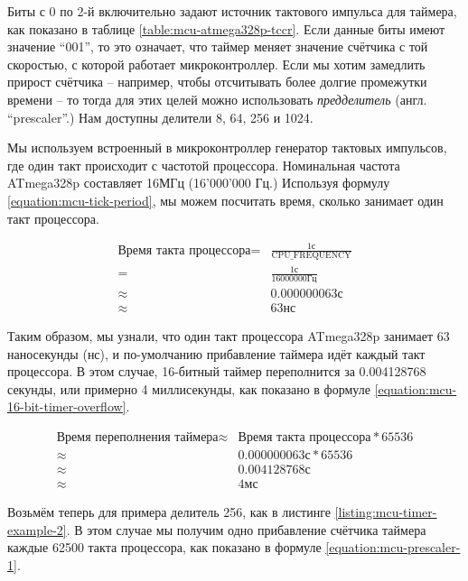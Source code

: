 \documentclass[../sparc.tex]{subfiles}
\begin{document}

Биты с 0 по 2-й включительно задают источник тактового импульса для таймера, как
показано в таблице \ref{table:mcu-atmega328p-tccr}.  Если данные биты имеют
значение ``001'', то это означает, что таймер меняет значение счётчика с той
скоростью, с которой работает микроконтроллер.  Если мы хотим замедлить прирост
счётчика -- например, чтобы отсчитывать более долгие промежутки времени -- то
тогда для этих целей можно использовать \emph{предделитель}
(англ. ``prescaler''.)  Нам доступны делители 8, 64, 256 и 1024.

Мы используем встроенный в микроконтроллер генератор тактовых импульсов, где
один такт происходит с частотой процессора.  Номинальная частота ATmega328p
составляет 16МГц (16'000'000 Гц.)  Используя формулу
\ref{equation:mcu-tick-period}, мы можем посчитать время, сколько занимает один
такт процессора.

\begin{align}
  \mbox{Время такта процессора} =& \frac{1\mbox{с}}{\mbox{CPU\_FREQUENCY}} \nonumber \\
  =& \frac{1\mbox{с}}{16000000 \mbox{Гц}} \nonumber \\
  \approx& 0.000000063\mbox{с} \\
  \approx& 63\mbox{нс}
  \label{equation:mcu-tick-period}
\end{align}

Таким образом, мы узнали, что один такт процессора ATmega328p занимает 63
наносекунды (нс), и по-умолчанию прибавление таймера идёт каждый такт
процессора.  В этом случае, 16-битный таймер переполнится за 0.004128768
секунды, или примерно 4 миллисекунды, как показано в формуле
\ref{equation:mcu-16-bit-timer-overflow}.

\begin{align}
  \mbox{Время переполнения таймера} \approx& \mbox{Время такта процессора} * 65536 \nonumber \\
  \approx& 0.000000063\mbox{с} * 65536 \nonumber \\
  \approx& 0.004128768\mbox{с} \\
  \approx& 4\mbox{мс}
  \label{equation:mcu-16-bit-timer-overflow}
\end{align}

Возьмём теперь для примера делитель 256, как в листинге
\ref{listing:mcu-timer-example-2}.  В этом случае мы получим одно прибавление
счётчика таймера каждые 62500 такта процессора, как показано в формуле
\ref{equation:mcu-prescaler-1}.
\end{document}
